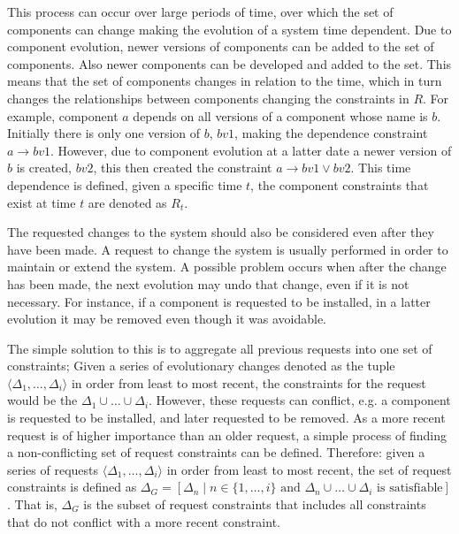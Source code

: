 This process can occur over large periods of time, over which the set of components can change making the evolution of a system time dependent.
Due to component evolution, newer versions of components can be added to the set of components.
Also newer components can be developed and added to the set.
This means that the set of components changes in relation to the time, which in turn changes the relationships between components changing the constraints in $R$.
For example, component $a$ depends on all versions of a component whose name is $b$.
Initially there is only one version of $b$, $bv1$, making the dependence constraint $a \rightarrow bv1$.
However, due to component evolution at a latter date a newer version of $b$ is created, $bv2$, this then created the constraint $a \rightarrow bv1 \vee bv2$.
This time dependence is defined, given a specific time $t$, the component constraints that exist at time $t$ are denoted as $R_t$.

The requested changes to the system should also be considered even after they have been made.
A request to change the system is usually performed in order to maintain or extend the system.
A possible problem occurs when after the change has been made, the next evolution may undo that change, even if it is not necessary.
For instance, if a component is requested to be installed, in a latter evolution it may be removed even though it was avoidable.

The simple solution to this is to aggregate all previous requests into one set of constraints;
Given a series of evolutionary changes denoted as the tuple $\langle \Delta_1, \ldots, \Delta_i \rangle$ in order from least to most recent,
the constraints for the request would be the $\Delta_1 \cup \ldots \cup \Delta_i$.
However, these requests can conflict, e.g. a component is requested to be installed, and later requested to be removed.
As a more recent request is of higher importance than an older request, a simple process of finding a non-conflicting set of request constraints can be defined.
Therefore: given a series of requests $\langle \Delta_1, \ldots, \Delta_i \rangle$ in order from least to most recent,
the set of request constraints is defined as $\Delta_G = [\Delta_n \mid n \in \{1, \ldots , i\} \mbox{ and } \Delta_n \cup \ldots \cup \Delta_i \mbox{ is satisfiable}]$.
That is, $\Delta_G$ is the subset of request constraints that includes all constraints that do not conflict with a more recent constraint.

